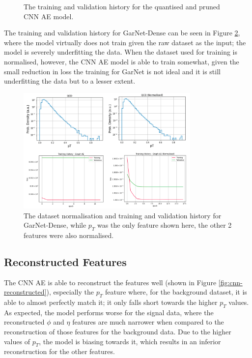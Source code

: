 \documentclass[a4paper]{article}
\theoremstyle{plain}
\theoremstyle{definition}
\begin{document}
\begin{figure}[H]
\begin{minipage}[c]{0.45\linewidth}
					\caption{The training and validation history for the quantised and pruned CNN AE model.}
					\label{fig:cnn-compressed-training}
				\end{minipage}
			\end{figure}

			The training and validation history for GarNet-Dense can be seen in Figure \ref{fig:garnet-training}, where the model virtually does not train given the raw dataset as the input; the model is severely underfitting the data. When the dataset used for training is normalised, however, the CNN AE model is able to train somewhat, given the small reduction in loss the training for GarNet is not ideal and it is still underfitting the data but to a lesser extent. 

			\begin{figure}[H]
				\centering
				\begin{minipage}[b]{\linewidth}
					\centering
					\includegraphics[width=0.8\textwidth]{garnet-training.png}
					\caption{The dataset normalisation and training and validation history for GarNet-Dense, while $p_T$ was the only feature shown here, the other 2 features were also normalised.}
					\label{fig:garnet-training}
				\end{minipage}
			\end{figure}



		\subsection{Reconstructed Features}

			The CNN AE is able to reconstruct the features well (shown in Figure \ref{fig:cnn-reconstructed}), especially the $p_T$ feature where, for the background dataset, it is able to almost perfectly match it; it only falls short towards the higher $p_T$ values. As expected, the model performs worse for the signal data, where the reconstructed $\phi$ and $\eta$ features are much narrower when compared to the reconstruction of those features for the background data. Due to the higher values of $p_T$, the model is biasing towards it, which results in an inferior reconstruction for the other features.
\end{document}
